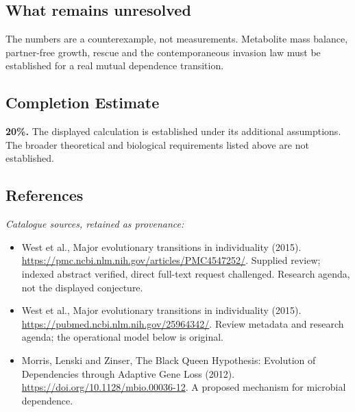 \documentclass[11pt]{article}
\begin{document}
\subsection{What remains unresolved}
The numbers are a counterexample, not measurements. Metabolite mass balance, partner-free growth, rescue and the contemporaneous invasion law must be established for a real mutual dependence transition.
\subsection{Completion Estimate}
\textbf{20\%.} The displayed calculation is established under its additional assumptions. The broader theoretical and biological requirements listed above are not established.
\subsection{References}
\noindent\emph{Catalogue sources, retained as provenance:}
\begin{itemize}
\item West et al., Major evolutionary transitions in individuality (2015). \url{https://pmc.ncbi.nlm.nih.gov/articles/PMC4547252/}. Supplied review; indexed abstract verified, direct full-text request challenged. Research agenda, not the displayed conjecture.
\item West et al., Major evolutionary transitions in individuality (2015). \url{https://pubmed.ncbi.nlm.nih.gov/25964342/}. Review metadata and research agenda; the operational model below is original.
\item Morris, Lenski and Zinser, The Black Queen Hypothesis: Evolution of Dependencies through Adaptive Gene Loss (2012). \url{https://doi.org/10.1128/mbio.00036-12}. A proposed mechanism for microbial dependence.
\end{itemize}
\clearpage


\appendix
\end{document}
